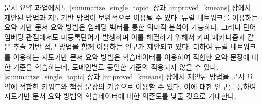 \documentclass[11pt]{article}
\begin{document}
문서 요약 과업에서도 \ref{summarize_single_topic} 장과 \ref{improved_kmeans} 장에서 제안된 방법과 지도기반 방법이 보완적으로 이용될 수 있다.
뉴럴 네트워크를 이용하는 요약 기반 문서 요약 방법은 임베딩 벡터를 통한 의미적 분석이 가능하다.
그러나 단어 임베딩 관점에서도 미등록단어가 발생하며 이를 해결하기 위해서 카피 매커니즘과 같은 추출 기반 접근 방법을 함께 이용하는 연구가 제안되고 있다.
더하여 뉴럴 네트워크를 이용하는 지도기반 문서 요약 방법은 학습데이터를 이용하여 적합한 요약 문장에 대한 기준을 학습하는데, 도메인별로 동일한 기준의 적용되지 않을 수 있다.
\ref{summarize_single_topic} 장과 \ref{improved_kmeans} 장에서 제안된 방법을 문서 요약에 적합한 키워드와 핵심 문장의 기준으로 이용할 수 있다.
이에 대한 연구를 통하여 지도기반 문서 요약 방법의 학습데이터에 대한 의존도를 낮출 것으로 기대한다.

\newpage

\end{document}
